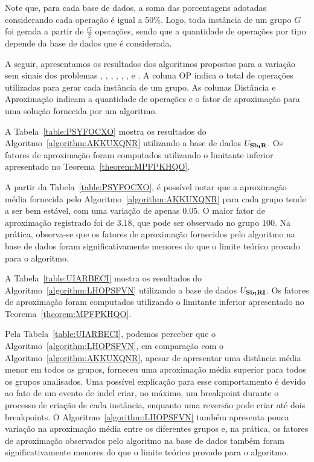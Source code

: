 Note que, para cada base de dados, a soma das porcentagens adotadas considerando cada operação é igual a 50\%. Logo, toda instância de um grupo $G$ foi gerada a partir de $\frac{G}{2}$ operações, sendo que a quantidade de operações por tipo depende da base de dados que é considerada. 

A seguir, apresentamos os resultados dos algoritmos propostos para a variação sem sinais dos problemas \SbIR{}, \SbIRI{}, \SbIRM{}, \SbIRMI{}, \SbIRT{}, \SbIRTI{}, \SbIRTM{} e \SbIRTMI{}. A coluna OP indica o total de operações utilizadas para gerar cada instância de um grupo. As colunas Distância e Aproximação indicam a quantidade de operações e o fator de aproximação para uma solução fornecida por um algoritmo.

A Tabela~\ref{table:PSYFOCXO} mostra os resultados do Algoritmo~\ref{algorithm:AKKUXQNR} utilizando a base de dados $U_{\textbf{Sb\textsubscript{I}R}}{}$. Os fatores de aproximação foram computados utilizando o limitante inferior apresentado no Teorema~\ref{theorem:MPFPKHQO}.



A partir da Tabela~\ref{table:PSYFOCXO}, é possível notar que a aproximação média fornecida pelo Algoritmo~\ref{algorithm:AKKUXQNR} para cada grupo tende a ser bem estável, com uma variação de apenas $0.05$. O maior fator de aproximação registrado foi de $3.18$, que pode ser observado no grupo 100. Na prática, observa-se que os fatores de aproximação fornecidos pelo algoritmo na base de dados foram significativamente menores do que o limite teórico provado para o algoritmo.

A Tabela~\ref{table:UIARBECI} mostra os resultados do Algoritmo~\ref{algorithm:LHOPSFVN} utilizando a base de dados $U_{\textbf{Sb\textsubscript{I}RI}}{}$. Os fatores de aproximação foram computados utilizando o limitante inferior apresentado no Teorema~\ref{theorem:MPFPKHQO}.



Pela Tabela~\ref{table:UIARBECI}, podemos perceber que o Algoritmo~\ref{algorithm:LHOPSFVN}, em comparação com o Algoritmo~\ref{algorithm:AKKUXQNR}, apesar de apresentar uma distância média menor em todos os grupos, forneceu uma aproximação média superior para todos os grupos analisados. Uma possível explicação para esse comportamento é devido ao fato de um evento de indel criar, no máximo, um breakpoint durante o processo de criação de cada instância, enquanto uma reversão pode criar até dois breakpoints. O Algoritmo~\ref{algorithm:LHOPSFVN} também apresenta pouca variação na aproximação média entre os diferentes grupos e, na prática, os fatores de aproximação observados pelo algoritmo na base de dados também foram significativamente menores do que o limite teórico provado para o algoritmo.


